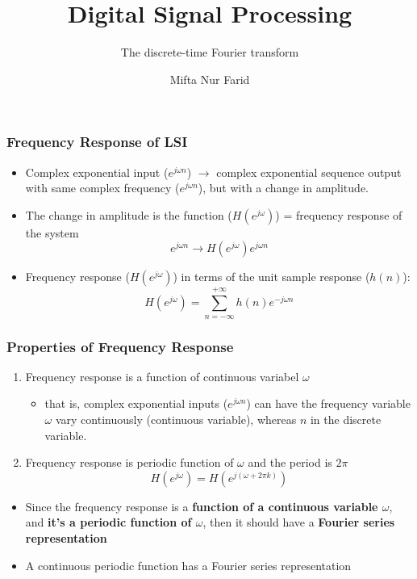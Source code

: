 \documentclass[pdflatex,compress,mathserif]{beamer}
\title{Digital Signal Processing}
\subtitle{The discrete-time Fourier transform}
\author{Mifta Nur Farid}
\begin{document}
\maketitle

\begin{frame}
	\frametitle{Frequency Response of LSI}
	\begin{itemize}
		\item Complex exponential input ($ e^{j \omega n} $) $\rightarrow$ complex exponential sequence output with same complex frequency ($ e^{j \omega n} $), but with a change in amplitude.
		\item The change in amplitude is the function ($ H(e^{j\omega}) $) = frequency response of the system
		\[ e^{j \omega n} \rightarrow H(e^{j\omega}) e^{j \omega n} \]
		\item Frequency response ($ H(e^{j\omega}) $) in terms of the unit sample response ($ h(n) $):
		\[ H(e^{j\omega}) = \sum\limits_{n = -\infty}^{+\infty} h(n) e^{-j \omega n} \]
	\end{itemize}
\end{frame}

\begin{frame}
	\frametitle{Properties of Frequency Response}
	\begin{enumerate}
		\item Frequency response is a function of continuous variabel $\omega$
		\begin{itemize}
			\item that is, complex exponential inputs ($ e^{j \omega n} $) can have the frequency variable $\omega$ vary continuously (continuous variable), whereas $ n $ in the discrete variable.
		\end{itemize}
		\item Frequency response is periodic function of $\omega$ and the period is $ 2 \pi $
		\[ H(e^{j \omega}) = H(e^{j(\omega + 2\pi k)})\]
	\end{enumerate}
	\begin{itemize}
		\item Since the frequency response is a \textbf{function of a continuous variable $\omega$}, and \textbf{it's a periodic function of $ \omega $}, then it should have a \textbf{Fourier series representation}
		\item A continuous periodic function has a Fourier series representation
	\end{itemize}
\end{frame}
\end{document}
